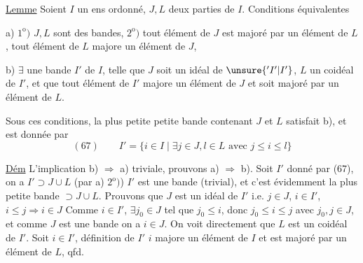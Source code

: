 
\uline{Lemme} Soient $I$ un ens ordonné, $J,L$ deux parties de $I$. Conditions équivalentes

a) $1^{\mathrm o})$ $J,L$ sont des bandes, $2^{\mathrm o})$ tout élément de $J$ est majoré par un élément de $L$, tout élément de $L$ majore un élément de $J$, 

b) $\exists$ une bande $I'$ de $I$, telle que $J$ soit un idéal de $\unsure{{}'I'|I'}$, $L$ un coidéal de $I'$, et que tout élément de $I'$ majore un élément de $J$ et soit majoré par un élément de $L$.

Sous ces conditions,    la plus petite petite bande  contenant $J$ et $L$ satisfait b), et est donnée par
\[
(67)\qquad I'=\{i\in I\mid\exists j\in J,l\in L\text{ avec }j\leq i\leq l\}
\]

\uline{Dém} L'implication b) $\Rightarrow$ a) triviale,  prouvons a) $\Rightarrow$ b). Soit $I'$ donné par (67), on a $I'\supset J\cup L$ (par a) $2^{\mathrm o})$) $I'$ est une bande (trivial), et c'est évidemment la plus petite bande $\supset J\cup L$. Prouvons que $J$ est un idéal de $I'$ i.e. $j\in J$, $i\in I'$, $i\leq j\Rightarrow i\in J$ Comme $i\in I'$, $\exists j_0\in J$ tel que $j_0\leq i$, donc $j_0\leq i\leq j$ avec $j_0,j\in J$, et comme $J$ est une bande  on a $i\in J$. On voit directement que $L$ est un coidéal de $I'$. Soit $i\in I'$,   définition de $I'$ $i$ majore un élément de $I$ et est majoré par un élément de $L$, qfd.
